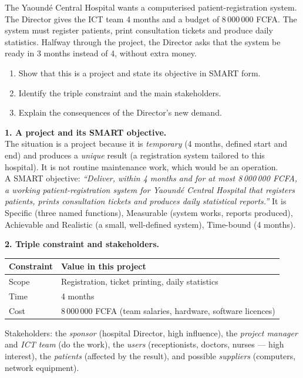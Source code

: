 \documentclass[11pt]{article}
\newcommand{\cle}[1]{{\popxbold\color{popdark}#1}}
\begin{document}
\begin{exoresolu}
The Yaoundé Central Hospital wants a computerised patient-registration system. The Director gives the ICT team 4 months and a budget of 8\,000\,000 FCFA. The system must register patients, print consultation tickets and produce daily statistics. Halfway through the project, the Director asks that the system be ready in 3 months instead of 4, without extra money.
\begin{enumerate}
\item Show that this is a project and state its objective in SMART form.
\item Identify the triple constraint and the main stakeholders.
\item Explain the consequences of the Director's new demand.
\end{enumerate}
\tcblower
\textbf{1. A project and its SMART objective.}\\
The situation is a \cle{project} because it is \emph{temporary} (4 months, defined start and end) and produces a \emph{unique} result (a registration system tailored to this hospital). It is not routine maintenance work, which would be an operation.\\
A SMART objective: \emph{``Deliver, within 4 months and for at most 8\,000\,000 FCFA, a working patient-registration system for Yaoundé Central Hospital that registers patients, prints consultation tickets and produces daily statistical reports.''} It is Specific (three named functions), Measurable (system works, reports produced), Achievable and Realistic (a small, well-defined system), Time-bound (4 months).

\textbf{2. Triple constraint and stakeholders.}
\begin{center}
\begin{tabularx}{\linewidth}{|l|X|}\hline
\rowcolor{popblueL} \textbf{Constraint} & \textbf{Value in this project} \\ \hline
Scope & Registration, ticket printing, daily statistics \\ \hline
Time & 4 months \\ \hline
Cost & 8\,000\,000 FCFA (team salaries, hardware, software licences) \\ \hline
\end{tabularx}
\end{center}
Stakeholders: the \emph{sponsor} (hospital Director, high influence), the \emph{project manager} and \emph{ICT team} (do the work), the \emph{users} (receptionists, doctors, nurses — high interest), the \emph{patients} (affected by the result), and possible \emph{suppliers} (computers, network equipment).


\end{exoresolu}
\end{document}
